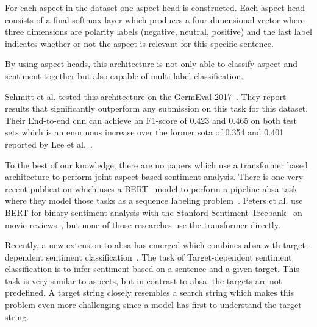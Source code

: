 For each aspect in the dataset one aspect head is constructed. Each aspect head consists of a final softmax layer which produces a four-dimensional vector where three dimensions are polarity labels {(negative, neutral, positive)} and the last label indicates whether or not the aspect is relevant for this specific sentence. 
\medskip

By using aspect heads, this architecture is not only able to classify aspect and sentiment together but also capable of multi-label classification.

Schmitt et al. tested this architecture on the GermEval-2017~\cite{Wojatzki2017}. They report results that significantly outperform any submission on this task for this dataset. Their End-to-end \gls{cnn} can achieve an F1-score of 0.423 and 0.465 on both test sets which is an enormous increase over the former \acrfull{sota} of 0.354 and 0.401 reported by Lee et al.~\cite{Lee2017}.
\medskip

To the best of our knowledge, there are no papers which use a transformer based architecture to perform joint aspect-based sentiment analysis. There is one very recent publication which uses a BERT~\cite{Devlin2018} model to perform a pipeline \gls{absa} task where they model those tasks as a sequence labeling problem~\cite{Xu2019}. Peters et al. use BERT for binary sentiment analysis with the Stanford Sentiment Treebank~\cite{Socher2013} on movie reviews~\cite{Peters2019}, but none of those researches use the transformer directly.
\medskip

Recently, a new extension to \gls{absa} has emerged which combines \gls{absa} with target-dependent sentiment classification~\cite{Tang2016}. The task of Target-dependent sentiment classification is to infer sentiment based on a sentence and a given target. This task is very similar to aspects, but in contrast to \gls{absa}, the targets are not predefined. A target string closely resembles a search string which makes this problem even more challenging since a model has first to understand the target string.